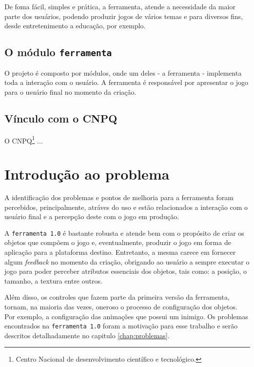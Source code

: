 \documentclass[12pt,twoside,openright,a4paper,english,brazil,sumario=tradicional]{abntex2}
\begin{document}
De foma fácil, simples e prática, a ferramenta, atende a necessidade da maior parte dos usuários, podendo produzir jogos de vários temas e para diversos fins, desde entretenimento a educação, por exemplo.

\subsection{O módulo \texttt{ferramenta}}
O projeto é composto por módulos, onde um deles - a ferramenta - implementa toda a interação com o usuário. A ferramenta é responsável por apresentar o jogo para o usuário final no momento da criação.

\subsection{Vínculo com o CNPQ} %

O CNPQ\footnote{Centro Nacional de desenvolvimento científico e tecnológico.} ...

\section{Introdução ao problema}
A identificação dos problemas e pontos de melhoria para a ferramenta foram percebidos, principalmente, atráves do uso e estão relacionados a interação com o usuário final e a percepção deste com o jogo em produção.

A \texttt{ferramenta 1.0} é bastante robusta e atende bem com o propósito de criar os objetos que compõem o jogo e, eventualmente, produzir o jogo em forma de aplicação para a plataforma destino. Entretanto, a mesma carece em fornecer algum \emph{feedback} no momento da criação, obrigando ao usuário a sempre executar o jogo para poder perceber atributos essenciais dos objetos, tais como: a posição, o tamanho, a textura entre outros.

Além disso, os controles que fazem parte da primeira versão da ferramenta, tornam, na maioria das vezes, oneroso o processo de configuração dos objetos. Por exemplo, a configuração das animações que possui um inimigo. Os problemas encontrados na \texttt{ferramenta 1.0} foram a motivação para esse trabalho e serão descritos detalhadamente no capitulo \ref{chap:problemas}.
\end{document}
